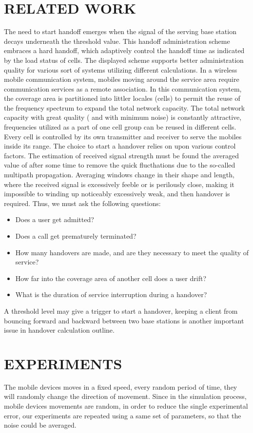 \documentclass[a4paper]{IEEEtran}
\begin{document}
\section{\textbf{RELATED WORK}}
The need to start handoff emerges when the signal of the serving base station decays underneath the threshold value. This handoff administration scheme embraces a hard handoff, which adaptively control the handoff time as indicated by the load status of cells. The displayed scheme supports better administration quality for various sort of systems utilizing different calculations. In a wireless mobile communication system, mobiles moving around the service area require communication services as a remote association. In this communication system, the coverage area is partitioned into littler locales (cells) to permit the reuse of the frequency spectrum to expand the total network capacity. The total network capacity with great quality ( and with minimum noise) is constantly attractive, frequencies utilized as a part of one cell group can be reused in different cells. Every cell is controlled by its own transmitter and receiver to serve the mobiles inside its range. The choice to start a handover relies on upon various control factors. The estimation of received signal strength must be found the averaged value of after some time to remove the quick flucthations due to the so-called multipath propagation. Averaging windows change in their shape and length, where the received signal is excessively feeble or is perilously close, making it impossible to winding up noticeably excessively weak, and then handover is required. Thus, we must ask the following questions:
\begin{itemize}
\item{Does a user get admitted?}
\item{Does a call get prematurely terminated?}
\item{How many handovers are made, and are they necessary to meet the quality of service?}
\item{How far into the coverage area of another cell does a user drift?}
\item{What is the duration of service interruption during a handover?}
\end{itemize}
A threshold level may give a trigger to start a handover, keeping a client from bouncing forward and backward between two base stations is another important issue in handover calculation outline.
\pagebreak

\section{\textbf{EXPERIMENTS}}
The mobile devices moves in a fixed speed, every random period of time, they will randomly change the direction of movement. Since in the simulation process, mobile devices movements are random, in order to reduce the single experimental error, our experiments are repeated using a same set of parameters, so that the noise could be averaged.
\end{document}
